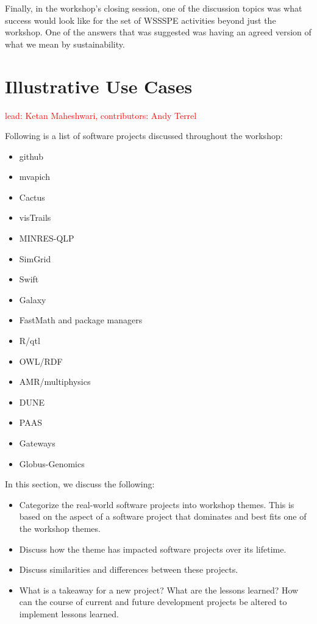 \documentclass[11pt, oneside]{amsart}
\newcommand{\note}[1]{ {\textcolor{red}    { #1 }}}
\begin{document}
Finally, in the workshop's closing session, one of the discussion topics was
what success would look like for the set of WSSSPE activities beyond just the workshop.
One of the answers that was suggested was
having an agreed version of what we mean by sustainability.


\section{Illustrative Use Cases} \label{sec:use-cases}

\note{lead: Ketan Maheshwari, contributors: Andy Terrel}

Following is a list of software projects discussed throughout the workshop:

\begin{itemize}
    \item github
    \item mvapich
    \item Cactus
    \item visTrails
    \item MINRES-QLP
    \item SimGrid
    \item Swift
    \item Galaxy
    \item FastMath and package managers
    \item R/qtl
    \item OWL/RDF
    \item AMR/multiphysics
    \item DUNE
    \item PAAS
    \item Gateways
    \item Globus-Genomics
\end{itemize}

In this section, we discuss the following:
\begin{itemize}
    \item Categorize the real-world software projects into workshop themes. This is based on the aspect of a software project that dominates and best fits one of the workshop themes.
    \item Discuss how the theme has impacted software projects over its lifetime.
    \item Discuss similarities and differences between these projects.
    \item What is a takeaway for a new project? What are the lessons learned? How can the course of current and future development projects be altered to implement lessons learned.
\end{itemize}
\end{document}
